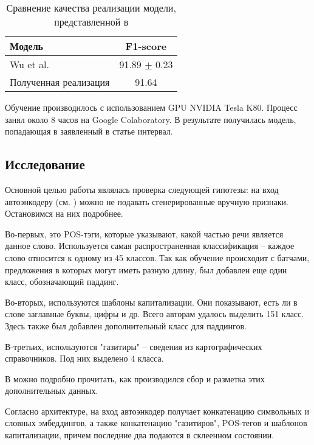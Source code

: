\documentclass[a4paper,14pt]{extarticle}
\begin{document}
\begin{table}[H]
    \caption{Сравнение качества реализации модели, представленной в \cite{1808.09075}}
    \label{progress}
    \begin{center}
    \begin{tabular}{l|c}
        Модель                 & F1-score           \\
        \hline
        Wu et al.              & 91.89 $\pm$ 0.23   \\
        Полученная реализация  & 91.64              \\
    \end{tabular}
    \end{center}
\end{table}

Обучение производилось с использованием GPU NVIDIA Tesla K80. Процесс занял около 8 часов на Google Colaboratory. В результате получилась модель, попадающая в заявленный в статье интервал.

\subsection{Исследование}

Основной целью работы являлась проверка следующей гипотезы: на вход автоэнкодеру (см. \cite{1808.09075}) можно не подавать сгенерированные вручную признаки. Остановимся на них подробнее.

Во-первых, это POS-тэги, которые указывают, какой частью речи является данное слово. Используется самая распространенная классификация -- каждое слово относится к одному из 45 классов. Так как обучение происходит с батчами, предложения в которых могут иметь разную длину, был добавлен еще один класс, обозначающий паддинг.

Во-вторых, используются шаблоны капитализации. Они показывают, есть ли в слове заглавные буквы, цифры и др. Всего авторам \cite{1808.09075} удалось выделить 151 класс. Здесь также был добавлен дополнительный класс для паддингов.

В-третьих, используются "газитиры" -- сведения из картографических справочников. Под них выделено 4 класса.

В \cite{1808.09075} можно подробно прочитать, как производился сбор и разметка этих дополнительных данных.

Согласно архитектуре, на вход автоэнкодер получает конкатенацию символьных и словных эмбеддингов, а также конкатенацию "газитиров", POS-тегов и шаблонов капитализации, причем последние два подаются в склеенном состоянии.
\end{document}
